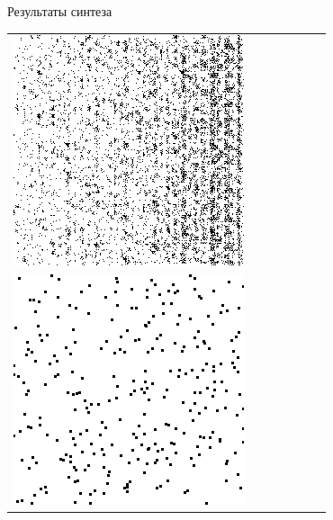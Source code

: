 \documentclass[12pt]{beamer}
\begin{document}
\begin{frame}{Результаты синтеза}
\begin{table}
\begin{center}
\begin{tabular}{p{1.2cm} p{1.2cm} p{1.2cm} p{1.2cm} p{1.2cm} p{1.2cm} p{1.2cm}}
					\includegraphics[width=1\linewidth]{8-results/sand-trend8/nf64e10/gen1}
					\\
					\includegraphics[width=1\linewidth]{8-results/sand-trend8/left2}

\end{tabular}
\end{center}
\end{table}
\end{frame}
\end{document}
